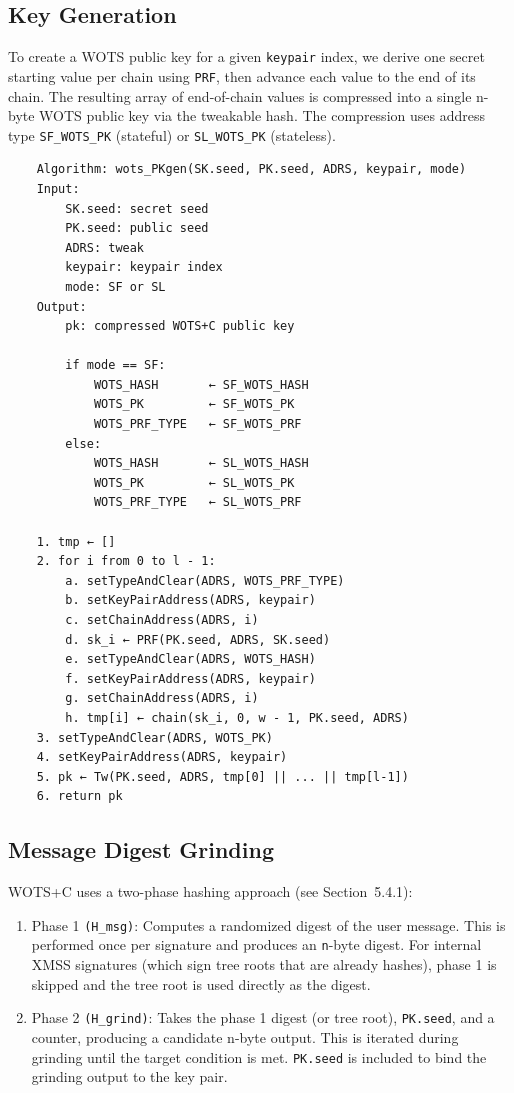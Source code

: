\subsection{Key Generation}
To create a WOTS public key for a given \texttt{keypair} index, we derive one secret starting value per chain using \texttt{PRF}, then advance each value to the end of its chain. The resulting array of end-of-chain values is compressed into a single n-byte WOTS public key via the tweakable hash. The compression uses address type \texttt{SF\_WOTS\_PK} (stateful) or \texttt{SL\_WOTS\_PK} (stateless).
\begin{verbatim}
    Algorithm: wots_PKgen(SK.seed, PK.seed, ADRS, keypair, mode)
    Input:
        SK.seed: secret seed
        PK.seed: public seed
        ADRS: tweak
        keypair: keypair index
        mode: SF or SL
    Output:
        pk: compressed WOTS+C public key

        if mode == SF: 
            WOTS_HASH       ← SF_WOTS_HASH
            WOTS_PK         ← SF_WOTS_PK
            WOTS_PRF_TYPE   ← SF_WOTS_PRF
        else:
            WOTS_HASH       ← SL_WOTS_HASH
            WOTS_PK         ← SL_WOTS_PK
            WOTS_PRF_TYPE   ← SL_WOTS_PRF

    1. tmp ← []
    2. for i from 0 to l - 1:
        a. setTypeAndClear(ADRS, WOTS_PRF_TYPE)
        b. setKeyPairAddress(ADRS, keypair)
        c. setChainAddress(ADRS, i)
        d. sk_i ← PRF(PK.seed, ADRS, SK.seed)
        e. setTypeAndClear(ADRS, WOTS_HASH)
        f. setKeyPairAddress(ADRS, keypair)
        g. setChainAddress(ADRS, i)
        h. tmp[i] ← chain(sk_i, 0, w - 1, PK.seed, ADRS)
    3. setTypeAndClear(ADRS, WOTS_PK)
    4. setKeyPairAddress(ADRS, keypair)
    5. pk ← Tw(PK.seed, ADRS, tmp[0] || ... || tmp[l-1])
    6. return pk
\end{verbatim}

\subsection{Message Digest Grinding}
WOTS+C uses a two-phase hashing approach (see Section~5.4.1):
\begin{enumerate}
    \item Phase 1 \texttt{(H\_msg)}: Computes a randomized digest of the user message. This is performed once per signature and produces an \texttt{n}-byte digest. For internal XMSS signatures (which sign tree roots that are already hashes), phase 1 is skipped and the tree root is used directly as the digest.
    \item Phase 2 \texttt{(H\_grind)}: Takes the phase 1 digest (or tree root), \texttt{PK.seed}, and a counter, producing a candidate n-byte output. This is iterated during grinding until the target condition is met. \texttt{PK.seed} is included to bind the grinding output to the key pair.
\end{enumerate}


